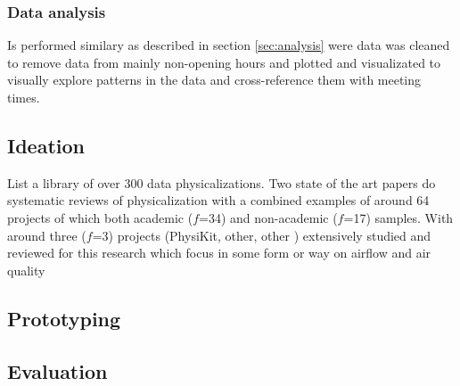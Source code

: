 \subsubsection{Data analysis}

Is performed similary as described in section \ref{sec:analysis} were data was cleaned to remove data from mainly non-opening hours and plotted and visualizated to visually explore patterns in the data and cross-reference them with meeting times.


\subsection{Ideation}

List a library of over 300 data physicalizations. Two state of the art papers do systematic reviews of physicalization with a combined examples of around 64 projects of which both academic ($f$=34) and non-academic ($f$=17) samples. With around three ($f$=3) projects (PhysiKit, other, other \cite{sauve_physecology_2022}) extensively studied and reviewed for this research which focus in some form or way on airflow and air quality

\subsection{Prototyping}

\subsection{Evaluation}
